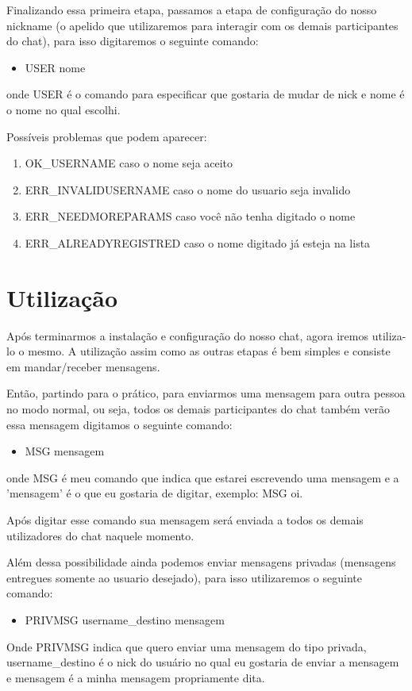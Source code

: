 \documentclass{abnt}
\begin{document}
	Finalizando essa primeira etapa, passamos a etapa de configuração do nosso nickname (o apelido que utilizaremos para interagir com os demais participantes do chat), para isso digitaremos o seguinte comando:
	\begin{itemize}
		\item USER nome	
	\end{itemize}
	onde USER é o comando para especificar que gostaria de mudar de nick e nome é o nome no qual escolhi.

	Possíveis problemas que podem aparecer:
	\begin{enumerate}
		
		\item  OK\_USERNAME caso o nome seja aceito
		\item  ERR\_INVALIDUSERNAME caso o nome do usuario seja invalido
		\item  ERR\_NEEDMOREPARAMS caso você não tenha digitado o nome
		\item  ERR\_ALREADYREGISTRED caso o nome digitado já esteja na lista	
	\end{enumerate}
	
	\section{Utilização}		
	Após terminarmos a instalação e configuração do nosso chat, agora iremos utiliza-lo o mesmo. A utilização assim como as outras etapas é bem simples e consiste em mandar/receber mensagens.

	Então, partindo para o prático, para enviarmos uma mensagem para outra pessoa no modo normal, ou seja, todos os demais participantes do chat também verão essa mensagem digitamos o seguinte comando:

	\begin{itemize}
		\item MSG mensagem 	
	\end{itemize}
	onde MSG é meu comando que indica que estarei escrevendo uma mensagem e a 'mensagem' é o que eu gostaria de digitar, exemplo: MSG oi.
	
	Após digitar esse comando sua mensagem será enviada a todos os demais utilizadores do chat naquele momento.
	
	Além dessa possibilidade ainda podemos enviar mensagens privadas (mensagens entregues somente ao usuario desejado), para isso utilizaremos o seguinte comando:
	\begin{itemize}
		\item PRIVMSG username\_destino mensagem
	\end{itemize}
	Onde PRIVMSG indica que quero enviar uma mensagem do tipo privada, username\_destino é o nick do usuário no qual eu gostaria de enviar a mensagem e mensagem é a minha mensagem propriamente dita.
	
\end{document}
